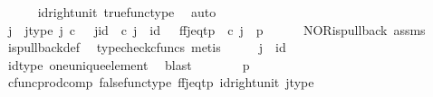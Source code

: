 \begin{isabellebody}
\ \ \ \ \isamarkupfalse%
\ id{\isacharunderscore}{\kern0pt}right{\isacharunderscore}{\kern0pt}unit{}\ true{\isacharunderscore}{\kern0pt}func{\isacharunderscore}{\kern0pt}type\ \isamarkupfalse%
\ auto\isanewline
\ \ \isamarkupfalse%
\ \isamarkupfalse%
\ j\ \ j{\isacharunderscore}{\kern0pt}type{\isacharcolon}{\kern0pt}\ {\isachardoublequoteopen}j\ {\isasymin}\isactrlsub c\ {\isasymone}{\isachardoublequoteclose}\ \ j{\isacharunderscore}{\kern0pt}id{\isacharcolon}{\kern0pt}\ {\isachardoublequoteopen}{\isasymbeta}\isactrlbsub {\isasymone}\isactrlesub \ {\isasymcirc}\isactrlsub c\ j\ {\isacharequal}{\kern0pt}\ id\ {\isasymone}{\isachardoublequoteclose}\ \ ff{\isacharunderscore}{\kern0pt}j{\isacharunderscore}{\kern0pt}eq{\isacharunderscore}{\kern0pt}tp{\isacharcolon}{\kern0pt}\ {\isachardoublequoteopen}{\isasymlangle}{\isasymf}{\isacharcomma}{\kern0pt}{\isasymf}{\isasymrangle}\ {\isasymcirc}\isactrlsub c\ j\ {\isacharequal}{\kern0pt}\ {\isasymlangle}p{\isacharcomma}{\kern0pt}{\isasymt}{\isasymrangle}{\isachardoublequoteclose}\isanewline
\ \ \ \ \isamarkupfalse%
\ NOR{\isacharunderscore}{\kern0pt}is{\isacharunderscore}{\kern0pt}pullback\ assms\ \isamarkupfalse%
\ is{\isacharunderscore}{\kern0pt}pullback{\isacharunderscore}{\kern0pt}def\ \isamarkupfalse%
\ {\isacharparenleft}{\kern0pt}typecheck{\isacharunderscore}{\kern0pt}cfuncs{\isacharcomma}{\kern0pt}\ metis{\isacharparenright}{\kern0pt}\isanewline
\ \ \isamarkupfalse%
\ \isamarkupfalse%
\ {\isachardoublequoteopen}j\ {\isacharequal}{\kern0pt}\ id\ {\isasymone}{\isachardoublequoteclose}\isanewline
\ \ \ \ \isamarkupfalse%
\ id{\isacharunderscore}{\kern0pt}type\ one{\isacharunderscore}{\kern0pt}unique{\isacharunderscore}{\kern0pt}element\ \isamarkupfalse%
\ blast\isanewline
\ \ \isamarkupfalse%
\ \isamarkupfalse%
\ {\isachardoublequoteopen}{\isasymlangle}{\isasymf}{\isacharcomma}{\kern0pt}{\isasymf}{\isasymrangle}\ {\isacharequal}{\kern0pt}\ {\isasymlangle}p{\isacharcomma}{\kern0pt}{\isasymt}{\isasymrangle}{\isachardoublequoteclose}\isanewline
\ \ \ \ \isamarkupfalse%
\ cfunc{\isacharunderscore}{\kern0pt}prod{\isacharunderscore}{\kern0pt}comp\ false{\isacharunderscore}{\kern0pt}func{\isacharunderscore}{\kern0pt}type\ ff{\isacharunderscore}{\kern0pt}j{\isacharunderscore}{\kern0pt}eq{\isacharunderscore}{\kern0pt}tp\ id{\isacharunderscore}{\kern0pt}right{\isacharunderscore}{\kern0pt}unit{}\ j{\isacharunderscore}{\kern0pt}type\ \isamarkupfalse%

\end{isabellebody}

